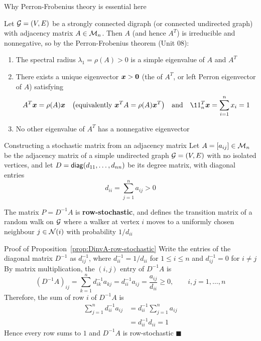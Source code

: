 \documentclass[aspectratio=169]{beamer}\usepackage[]{graphicx}\usepackage[]{xcolor}
\begin{document}
\begin{frame}{Why Perron-Frobenius theory is essential here}
\begin{theorem}
Let $\mathcal{G} = (V, E)$ be a strongly connected digraph (or connected undirected graph) with adjacency matrix $A \in \mathcal{M}_n$. Then $A$ (and hence $A^T$) is irreducible and nonnegative, so by the Perron-Frobenius theorem (Unit 08):
\begin{enumerate}
\item The spectral radius $\lambda_1 = \rho(A) > 0$ is a simple eigenvalue of $A$ and $A^T$
\item There exists a unique eigenvector $\bx > \b0$ (the  of $A^T$, or left Perron eigenvector of $A$) satisfying
\[
A^T \bx = \rho(A)\bx \quad \bigl(\text{equivalently } \bx^T A = \rho(A)\bx^T\bigr) \quad \text{and} \quad \11_n^T \bx = \sum_{i=1}^n x_i = 1
\]
\item No other eigenvalue of $A^T$ has a nonnegative eigenvector
\end{enumerate}
\end{theorem}
\end{frame}

\begin{frame}{Constructing a stochastic matrix from an adjacency matrix}
Let $A = [a_{ij}] \in \mathcal{M}_n$ be the adjacency matrix of a simple undirected graph $\mathcal{G} = (V, E)$ with no isolated vertices, and let $D = \mathsf{diag}(d_{11}, \ldots, d_{nn})$ be its degree matrix, with diagonal entries
\[
d_{ii} = \sum_{j=1}^n a_{ij} > 0
\]
\vfill
\begin{proposition}
\label{prop:DinvA-row-stochastic}
The matrix $P = D^{-1} A$ is \textbf{row-stochastic}, and defines the transition matrix of a random walk on $\mathcal{G}$ where a walker at vertex $i$ moves to a uniformly chosen neighbour $j \in \mathcal{N}(i)$ with probability $1/d_{ii}$
\end{proposition}
\end{frame}

\begin{frame}{Proof of Proposition~\ref{prop:DinvA-row-stochastic}}
Write the entries of the diagonal matrix $D^{-1}$ as $d_{ij}^{-1}$, where $d_{ii}^{-1} = 1/d_{ii}$ for $1 \le i \le n$ and $d_{ij}^{-1} = 0$ for $i \neq j$
\vfill
By matrix multiplication, the $(i, j)$ entry of $D^{-1} A$ is
\[
(D^{-1} A)_{ij} = \sum_{k=1}^n d_{ik}^{-1} a_{kj} = d_{ii}^{-1} a_{ij} = \frac{a_{ij}}{d_{ii}} \ge 0, \qquad i, j = 1, \ldots, n
\]
\vfill
Therefore, the sum of row $i$ of $D^{-1} A$ is
\begin{align*}
\sum_{j=1}^n d_{ii}^{-1} a_{ij}
&= d_{ii}^{-1} \sum_{j=1}^n a_{ij} \\
&= d_{ii}^{-1} d_{ii} = 1
\end{align*}
Hence every row sums to $1$ and $D^{-1} A$ is row-stochastic \hfill $\blacksquare$
\end{frame}
\end{document}
